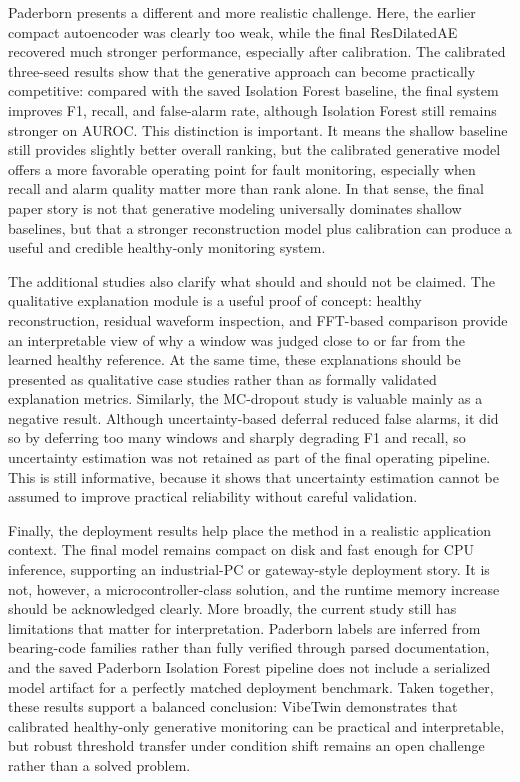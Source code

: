 Paderborn presents a different and more realistic challenge. Here, the earlier compact autoencoder was clearly too weak, while the final ResDilatedAE recovered much stronger performance, especially after calibration. The calibrated three-seed results show that the generative approach can become practically competitive: compared with the saved Isolation Forest baseline, the final system improves F1, recall, and false-alarm rate, although Isolation Forest still remains stronger on AUROC. This distinction is important. It means the shallow baseline still provides slightly better overall ranking, but the calibrated generative model offers a more favorable operating point for fault monitoring, especially when recall and alarm quality matter more than rank alone. In that sense, the final paper story is not that generative modeling universally dominates shallow baselines, but that a stronger reconstruction model plus calibration can produce a useful and credible healthy-only monitoring system.

The additional studies also clarify what should and should not be claimed. The qualitative explanation module is a useful proof of concept: healthy reconstruction, residual waveform inspection, and FFT-based comparison provide an interpretable view of why a window was judged close to or far from the learned healthy reference. At the same time, these explanations should be presented as qualitative case studies rather than as formally validated explanation metrics. Similarly, the MC-dropout study is valuable mainly as a negative result. Although uncertainty-based deferral reduced false alarms, it did so by deferring too many windows and sharply degrading F1 and recall, so uncertainty estimation was not retained as part of the final operating pipeline. This is still informative, because it shows that uncertainty estimation cannot be assumed to improve practical reliability without careful validation.

Finally, the deployment results help place the method in a realistic application context. The final model remains compact on disk and fast enough for CPU inference, supporting an industrial-PC or gateway-style deployment story. It is not, however, a microcontroller-class solution, and the runtime memory increase should be acknowledged clearly. More broadly, the current study still has limitations that matter for interpretation. Paderborn labels are inferred from bearing-code families rather than fully verified through parsed documentation, and the saved Paderborn Isolation Forest pipeline does not include a serialized model artifact for a perfectly matched deployment benchmark. Taken together, these results support a balanced conclusion: VibeTwin demonstrates that calibrated healthy-only generative monitoring can be practical and interpretable, but robust threshold transfer under condition shift remains an open challenge rather than a solved problem.




